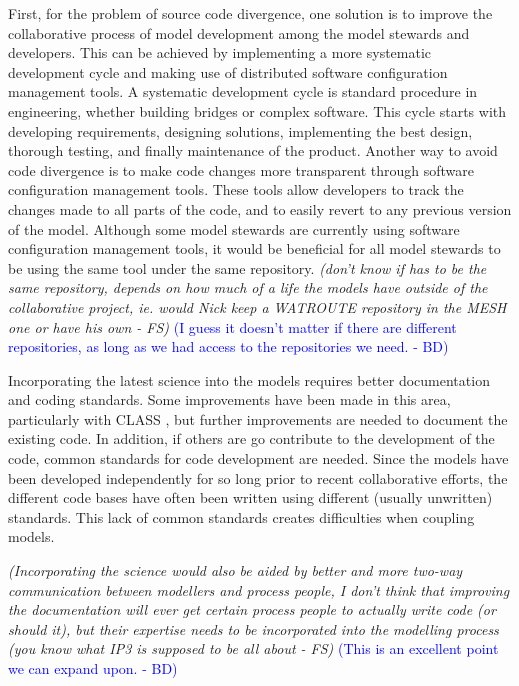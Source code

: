 \documentclass[hess]{copernicus}
\begin{document}
First, for the problem of source code divergence, one solution is to improve the collaborative process of model development among the model stewards and developers. This can be achieved by implementing a more systematic development cycle and making use of distributed software configuration management tools. A systematic development cycle is standard procedure in engineering, whether building bridges or complex software. This cycle starts with developing requirements, designing solutions, implementing the best design, thorough testing, and finally maintenance of the product. Another way to avoid code divergence is to make code changes more transparent through software configuration management tools. These tools allow developers to track the changes made to all parts of the code, and to easily revert to any previous version of the model. Although some model stewards are currently using software configuration management tools, it would be beneficial for all model stewards to be using the same tool under the same repository. {\em (don't know if has to be the same repository, depends on how much of a life the models have outside of the collaborative project, ie. would Nick keep a WATROUTE repository in the MESH one or have his own - FS)}\textcolor{blue}{ (I guess it doesn't matter if there are different repositories, as long as we had access to the repositories we need. - BD)}

Incorporating the latest science into the models requires better documentation and coding standards. Some improvements have been made in this area, particularly with CLASS \citep{verseghy:2009}, but further improvements are needed to document the existing code. In addition, if others are go contribute to the development of the code, common standards for code development are needed. Since the models have been developed independently for so long prior to recent collaborative efforts, the different code bases have often been written using different (usually unwritten) standards. This lack of common standards creates difficulties when coupling models.

{\em (Incorporating the science would also be aided by better and more two-way communication between modellers and process people, I don't think that improving the documentation will ever get certain process people to actually write code (or should it), but their expertise needs to be incorporated into the modelling process (you know what IP3 is supposed to be all about - FS)} \textcolor{blue}{ (This is an excellent point we can expand upon. - BD)}
\end{document}
